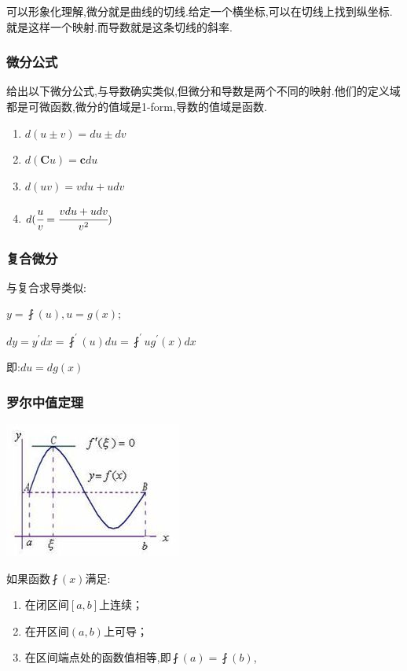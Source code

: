 \documentclass[UTF8,12pt]{ctexbook}
\newcommand{\derivative}{^\prime}
\begin{document}
{{{可以形象化理解,微分就是曲线的切线.给定一个横坐标,可以在切线上找到纵坐标.就是这样一个映射.而导数就是这条切线的斜率.

\subsubsection{微分公式}{
  给出以下微分公式,与导数确实类似,但微分和导数是两个不同的映射.他们的定义域都是可微函数,微分的值域是1-form,导数的值域是函数.
  \begin{enumerate}
    \item $d(u \pm v) = du \pm dv$
    \item $d(\mathbf{C}u) = \mathbf{c}du$
    \item $d(uv) = vdu + udv$
    \item $d(\cfrac{u}{v} = \cfrac{vdu + udv}{v^2})$
  \end{enumerate}
}%

\subsubsection{复合微分}{
  与复合求导类似:

  $y = \fint(u), u = g(x);$

  $dy = y\derivative dx = \fint\derivative(u)du = \fint\derivative{u}g\derivative(x)dx$

  即:$du = dg(x)$
}%

\subsubsection{罗尔中值定理}{
  \begin{center}
    \includegraphics{resources/Rolle's_mean_value_theorem.jpg}
  \end{center}

  如果函数$\fint(x)$满足:

  \begin{enumerate}
    \item 在闭区间$[a,b]$上连续；
    \item 在开区间$(a,b)$上可导；
    \item 在区间端点处的函数值相等,即$\fint(a) = \fint(b)$,
  \end{enumerate}

}}}}
\end{document}
